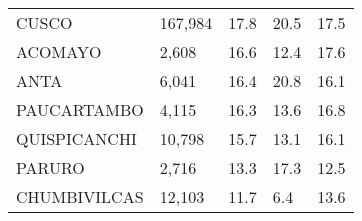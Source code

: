 \begin{tabular}{lllll}
	\cellcolor[HTML]{FF5050}CUSCO                                  & 167,984                                                               & 17.8                                                                             & 20.5                                                                        & 17.5                                                                                \\
	\cellcolor[HTML]{FF5050}ACOMAYO                                & 2,608                                                                 & 16.6                                                                             & 12.4                                                                        & 17.6                                                                                \\
	\cellcolor[HTML]{FF5050}ANTA                                   & 6,041                                                                 & 16.4                                                                             & 20.8                                                                        & 16.1                                                                                \\
	\cellcolor[HTML]{FF5050}PAUCARTAMBO                            & 4,115                                                                 & 16.3                                                                             & 13.6                                                                        & 16.8                                                                                \\
	\cellcolor[HTML]{FF5050}QUISPICANCHI                           & 10,798                                                                & 15.7                                                                             & 13.1                                                                        & 16.1                                                                                \\
	\cellcolor[HTML]{FF5050}PARURO                                 & 2,716                                                                 & 13.3                                                                             & 17.3                                                                        & 12.5                                                                                \\
	\cellcolor[HTML]{FF5050}CHUMBIVILCAS                           & 12,103                                                                & 11.7                                                                             & 6.4                                                                         & 13.6                                                                                \\

\end{tabular}

